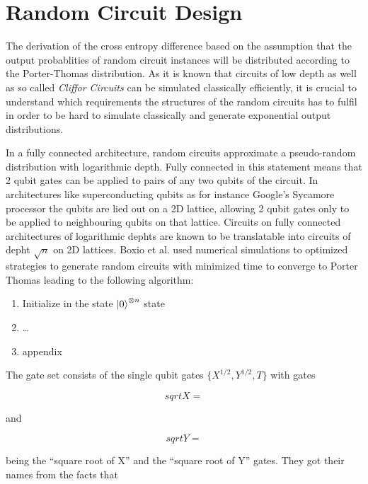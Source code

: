 \section{Random Circuit Design}

The derivation of the cross entropy difference based on the assumption that the
output probablities of random circuit instances will be distributed according to
the Porter-Thomas distribution. As it is known that circuits of low depth as
well as so called \textit{Cliffor Circuits} can be simulated classically
efficiently, it is crucial to understand which requirements the structures of
the random circuits has to fulfil in order to be hard to simulate classically and generate
exponential output distributions.

In a fully connected architecture, random circuits approximate a pseudo-random
distribution with logarithmic depth. Fully connected in this statement means
that 2 qubit gates can be applied to pairs of any two qubits of the circuit. In
architectures like superconducting qubits as for instance Google's Sycamore
processor the qubits are lied out on a 2D lattice, allowing 2 qubit gates only
to be applied to neighbouring qubits on that lattice. Circuits on fully
connected architectures of logarithmic dephts are known to be translatable into
circuits of depht $\sqrt{n}$ on 2D lattices. Boxio et al. used numerical
simulations to optimized strategies to generate random circuits with minimized
time to converge to Porter Thomas leading to the following algorithm:

\begin{enumerate}
\item Initialize in the state $\Ket{0}^{\otimes n}$ state
\item \dots
  \item appendix
  \end{enumerate}

The gate set consists of the single qubit gates $\{X^{1/2}, Y^{1/2}, T\}$ with
gates

\begin{equation}
 sqrtX =
\end{equation}

and

\begin{equation}
  sqrtY = 
\end{equation}

being the ``square root of X'' and the ``square root of Y'' gates. They got
their names from the facts that


